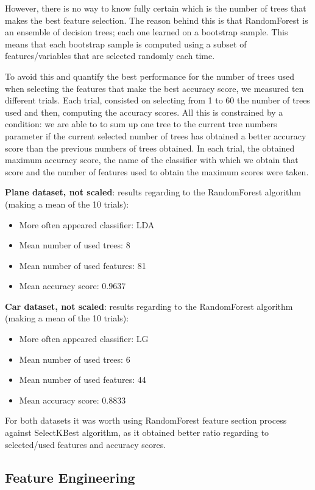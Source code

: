 \documentclass{article} %
\begin{document}
However, there is no way to know fully certain which is the number of trees that makes the best feature selection. The reason behind this is that RandomForest is an ensemble of decision trees; each one learned on a bootstrap sample. This means that each bootstrap sample is computed using a subset of features/variables that are selected randomly each time.

To avoid this and quantify the best performance for the number of trees used when selecting the features that make the best accuracy score, we measured ten different trials. Each trial, consisted on selecting from 1 to 60 the number of trees used and then, computing the accuracy scores. All this is constrained by a condition: we are able to to sum up one tree to the current tree numbers parameter if the current selected number of trees has obtained a better accuracy score than the previous numbers of trees obtained. In each trial, the obtained maximum accuracy score, the name of the classifier with which we obtain that score and the number of features used to obtain the maximum scores were taken.

\textbf{Plane dataset, not scaled}: results regarding to the RandomForest algorithm (making a mean of the 10 trials):
\begin{itemize}
    \item More often appeared classifier: LDA
    \item Mean number of used trees: 8
    \item Mean number of used features: 81
    \item Mean accuracy score: $0.9637$
\end{itemize}

\textbf{Car dataset, not scaled}: results regarding to the RandomForest algorithm (making a mean of the 10 trials):
\begin{itemize}
    \item More often appeared classifier: LG
    \item Mean number of used trees: 6
    \item Mean number of used features: 44
    \item Mean accuracy score: $0.8833$
\end{itemize}

For both datasets it was worth using RandomForest feature section process against SelectKBest algorithm, as it obtained better ratio regarding to selected/used features and accuracy scores.

\subsection{Feature Engineering}
\end{document}
